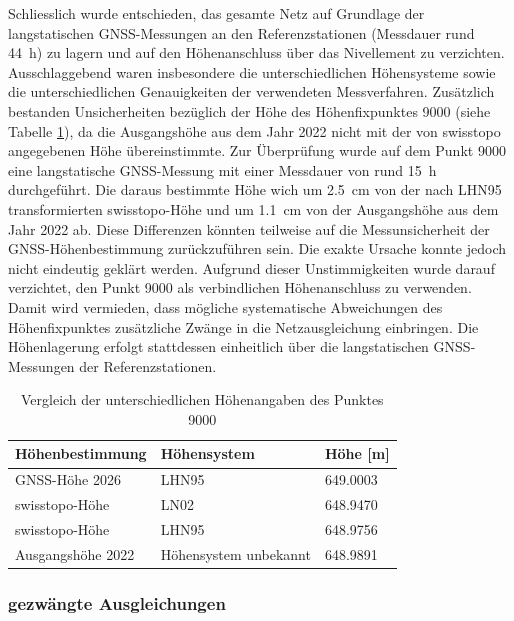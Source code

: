 Schliesslich wurde entschieden, das gesamte Netz auf Grundlage der langstatischen GNSS-Messungen an den
Referenzstationen (Messdauer rund 44~h) zu lagern und auf den Höhenanschluss über das Nivellement zu verzichten.
Ausschlaggebend waren insbesondere die unterschiedlichen Höhensysteme sowie die unterschiedlichen Genauigkeiten
der verwendeten Messverfahren. Zusätzlich bestanden Unsicherheiten bezüglich der Höhe des Höhenfixpunktes 9000 (siehe Tabelle \ref{tab:hoehenvergleich-9000}),
da die Ausgangshöhe aus dem Jahr 2022 nicht mit der von swisstopo angegebenen Höhe übereinstimmte. Zur Überprüfung
wurde auf dem Punkt 9000 eine langstatische GNSS-Messung mit einer Messdauer von rund 15~h durchgeführt. Die daraus
bestimmte Höhe wich um 2.5~cm von der nach LHN95 transformierten swisstopo-Höhe und um 1.1~cm von der
Ausgangshöhe aus dem Jahr 2022 ab. Diese Differenzen könnten teilweise auf die Messunsicherheit der GNSS-Höhenbestimmung
zurückzuführen sein. Die exakte Ursache konnte jedoch nicht eindeutig geklärt werden. Aufgrund dieser Unstimmigkeiten
wurde darauf verzichtet, den Punkt 9000 als verbindlichen Höhenanschluss zu verwenden. Damit wird vermieden,
dass mögliche systematische Abweichungen des Höhenfixpunktes zusätzliche Zwänge in die Netzausgleichung
einbringen. Die Höhenlagerung erfolgt stattdessen einheitlich über die langstatischen GNSS-Messungen der Referenzstationen. \bigskip

\begin{table}[H]
    \centering
    \begin{tabularx}{\textwidth}{p{4cm} X X}
        \toprule
        Höhenbestimmung & Höhensystem & Höhe [m] \\
        \midrule
        GNSS-Höhe 2026 & LHN95 & 649.0003 \\
        \addlinespace
        swisstopo-Höhe & LN02 & 648.9470 \\
        \addlinespace
        swisstopo-Höhe & LHN95 & 648.9756 \\
        \addlinespace
        Ausgangshöhe 2022 & Höhensystem unbekannt & 648.9891 \\
        \bottomrule
    \end{tabularx}
    \caption{Vergleich der unterschiedlichen Höhenangaben des Punktes 9000}
    \label{tab:hoehenvergleich-9000}
\end{table}

\subsubsection{gezwängte Ausgleichungen}
\label{sec:gezwängte ausgleichungen}

